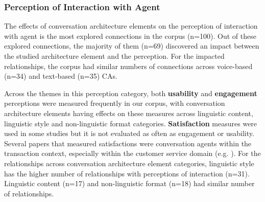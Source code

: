 \documentclass[sigconf,screen,review, anonymous]{acmart}
\newcommand{\cmt}[1]{}%
\begin{document}

 

\subsubsection{Perception of Interaction with Agent}

The effects of conversation architecture elements on the perception of interaction with agent is the most explored connections in the corpus (n=100). Out of these explored connections, the majority of them (n=69) discovered an impact between the studied architecture element and the perception. For the impacted relationships, the corpus had similar numbers of connections across voice-based (n=34) and text-based (n=35) CAs.

Across the themes in this perception category, both \textbf{usability} and \textbf{engagement} perceptions were measured frequently in our corpus, with conversation architecture elements having effects on these measures across linguistic content, linguistic style and non-linguistic format categories. \textbf{Satisfaction} measures were used in some studies but it is not evaluated as often as engagement or usability. Several papers that measured satisfactions were conversation agents within the transaction context, especially within the customer service domain (e.g. \cite{diederich2019emulating}\cmt{[25]}\cite{elsholz2019exploring}\cmt{[61]}\cite{gnewuch2018faster}\cmt{[19]}). For the relationships across conversation architecture element categories, linguistic style has the higher number of relationships with perceptions of interaction (n=31). Linguistic content (n=17) and non-linguistic format (n=18) had similar number of relationships.
\end{document}
